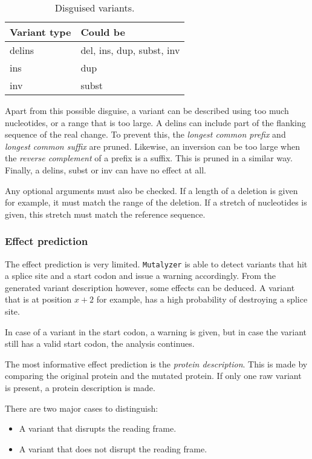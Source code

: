 \documentclass{article}
\begin{document}
\begin{table}[H]
\begin{center}
\begin{tabular}{l|l}
Variant type & Could be \\
\hline
delins & del, ins, dup, subst, inv \\
ins    & dup \\
inv    & subst
\end{tabular}
\end{center}
\caption{Disguised variants.} \label{tab:erosion}
\end{table}

Apart from this possible disguise, a variant can be described using too much
nucleotides, or a range that is too large. A delins can include part of the
flanking sequence of the real change. To prevent this, the \emph{longest common
prefix} and \emph{longest common suffix} are pruned. Likewise, an inversion
can be too large when the \emph{reverse complement} of a prefix is a suffix.
This is pruned in a similar way. Finally, a delins, subst or inv can have no
effect at all.

Any optional arguments must also be checked. If a length of a deletion is given
for example, it must match the range of the deletion. If a stretch of
nucleotides is given, this stretch must match the reference sequence.

\subsubsection{Effect prediction} \label{subsubsec:effect}
The effect prediction is very limited. \texttt{Mutalyzer} is able to detect
variants that hit a splice site and a start codon and issue a warning
accordingly. From the generated variant description however, some effects can
be deduced. A variant that is at position $x+2$ for example, has a high
probability of destroying a splice site.

In case of a variant in the start codon, a warning is given, but in case the
variant still has a valid start codon, the analysis continues.

The most informative effect prediction is the \emph{protein description}. This
is made by comparing the original protein and the mutated protein. If only one
raw variant is present, a protein description is made.

There are two major cases to distinguish:
\begin{itemize}
\item A variant that disrupts the reading frame.
\item A variant that does not disrupt the reading frame.
\end{itemize}
\end{document}
